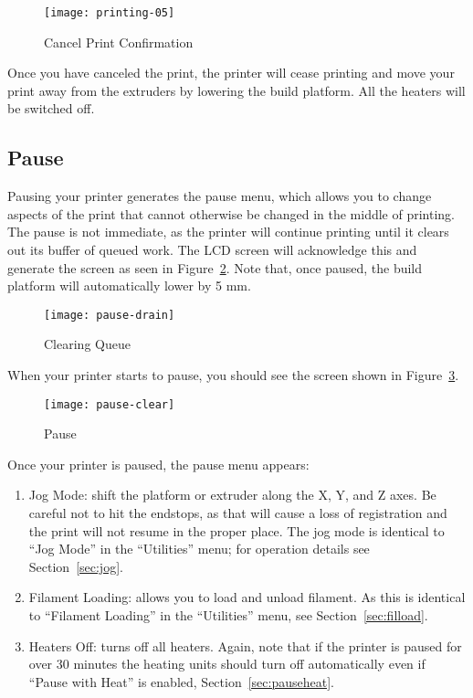 \begin{figure}[!htbp]
  \centering
    \texttt{[image: printing-05]}
    \caption{Cancel Print Confirmation}
  \label{fig:cancel}
\end{figure}

Once you have canceled the print, the printer will cease printing and move your print away from the extruders by lowering the build platform.  All the heaters will be switched off.


\subsection{Pause}\label{sec:pause}

Pausing your printer generates the pause menu, which allows you to change aspects of the print that cannot otherwise be changed in the middle of printing.  The pause is not immediate, as the printer will continue printing until it clears out its buffer of queued work.  The LCD screen will acknowledge this and generate the screen as seen in Figure~\ref{fig:clear}.  Note that, once paused, the build platform will automatically lower by 5 mm.

\begin{figure}[!htbp]
  \centering
    \texttt{[image: pause-drain]}
    \caption{Clearing Queue}
  \label{fig:clear}
\end{figure}

When your printer starts to pause, you should see the screen shown in Figure~\ref{fig:startpause}.

\begin{figure}[!htbp]
  \centering
    \texttt{[image: pause-clear]}
    \caption{Pause}
  \label{fig:startpause}
\end{figure}

Once your printer is paused, the pause menu appears:

\begin{enumerate}
\item Jog Mode: shift the platform or extruder along the X, Y, and Z axes.  Be careful not to hit the endstops, as that will cause a loss of registration and the print will not resume in the proper place.  The jog mode is identical to ``Jog Mode'' in the ``Utilities'' menu; for operation details see Section~\ref{sec:jog}.
\item Filament Loading: allows you to load and unload filament.  As this is identical to ``Filament Loading'' in the ``Utilities'' menu, see Section~\ref{sec:filload}.
\item Heaters Off: turns off all heaters.  Again, note that if the printer is paused for over 30 minutes the heating units should turn off automatically even if ``Pause with Heat'' is enabled, Section~\ref{sec:pauseheat}.
\end{enumerate}

